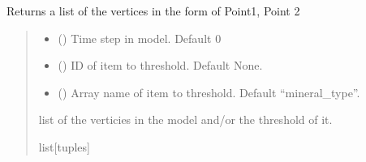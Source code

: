\documentclass[letterpaper,10pt,english]{sphinxmanual}
\begin{document}
\begin{fulllineitems}
\begin{fulllineitems}
\label{\detokenize{pyfdempp:pyfdempp.pyfdempp.Model.model_vertices}}
\pysigstartsignatures
{}
\pysigstopsignatures
\sphinxAtStartPar
Returns a list of the vertices in the form of Point1, Point 2
\begin{quote}\begin{description}
\begin{itemize}
\item {} 
\sphinxAtStartPar
{} () \textendash{} Time step in model. Default 0

\item {} 
\sphinxAtStartPar
{} () \textendash{} ID of item to threshold. Default None.

\item {} 
\sphinxAtStartPar
{} () \textendash{} Array name of item to threshold. Default “mineral\_type”.

\end{itemize}

\sphinxAtStartPar
list of the verticies in the model and/or the threshold of it.

\sphinxAtStartPar
list{[}tuples{]}

\end{description}\end{quote}


\end{fulllineitems}
\end{fulllineitems}
\end{document}

